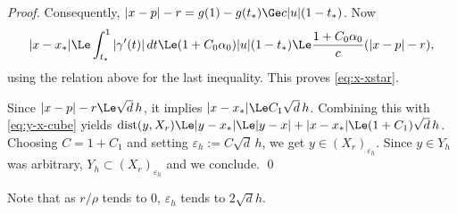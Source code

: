 \begin{proof}
Consequently, $|x-p|-r = g(1)-g(t_*) \Ge c|u|(1-t_*)$. Now
\[
|x-x_*| \Le \int_{t_*}^1|\gamma'(t)|\,dt \Le (1+C_0\alpha_0)|u|(1-t_*) \Le \frac{1+C_0\alpha_0}{c}(|x-p|-r),
\]
using the relation above for the last inequality. This proves
\eqref{eq:x-xstar}. 

Since $|x-p|-r\Le\sqrt d\,h$, it implies $|x-x_*| \Le C_1\sqrt
d\,h$.  Combining this with \eqref{eq:y-x-cube} yields
$\operatorname{dist}(y,X_r) \Le |y-x_*| \Le |y-x|+|x-x_*| \Le
(1+C_1)\sqrt d\,h$.  Choosing $C=1+C_1$ and setting $\varepsilon_h :=
C\sqrt d\,h$, we get $y\in(X_r)_{\varepsilon_h}$.  Since $y\in Y_h$
was arbitrary, $Y_h\subset(X_r)_{\varepsilon_h}$ and we conclude. \qed
\end{proof}
Note that as $r/\rho$ tends to $0$, $\varepsilon_h$ tends to $2\sqrt{d}h$.

